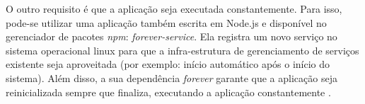 O outro requisito é que a aplicação seja executada constantemente. Para isso,
pode-se utilizar uma aplicação também escrita em Node.js e disponível no
gerenciador de pacotes \emph{npm}: \emph{forever-service}. Ela registra um novo serviço no sistema operacional
linux para que a infra-estrutura de gerenciamento de serviços	existente seja
aproveitada (por exemplo: início automático após o início do sistema). Além disso, a sua dependência
\emph{forever} garante que a aplicação seja reinicializada sempre que finaliza,
executando a aplicação constantemente \cite{forever-service}.
